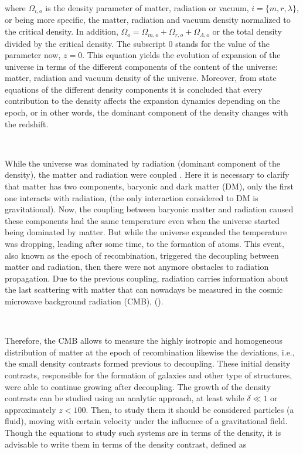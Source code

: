 \documentclass[a4,useAMS,usegraphicx,12pt]{article}
\begin{document}
where $\Omega_{i,o}$ is the density parameter of matter, radiation or vacuum, $i=\{m, r,\lambda\}$, 
or being more specific, the matter, radiation and vacuum density normalized to the critical density.  In addition, 
$\Omega_o=\Omega_{m,o} +\Omega_{r,o}+\Omega_{\Lambda,o}$ or the total density divided
by the critical density. The subscript $0$ stands for the value of the parameter now, $z=0$.
This equation yields the evolution of expansion of the universe in terms  
of the different components of the content of the universe: 
matter, radiation and vacuum density of the universe. 
Moreover, from state equations of the different density components it is concluded that every contribution to the density affects the expansion
dynamics depending on the epoch, or in other words,  the dominant component of the density 
changes with the redshift.  

\

While the universe was dominated 
by radiation (dominant component of the density), the matter and radiation were coupled . 
Here it is necessary to clarify that matter has two components, baryonic and dark matter (DM),
only the first one interacts with radiation, (the only interaction considered to DM is 
gravitational). 
Now, the coupling between baryonic matter
and radiation caused these components had the same temperature even when the universe 
started being dominated by matter. 
But while the universe expanded 
the temperature was dropping, leading after some time, to the formation of atoms. 
This event, also known as the epoch of recombination, triggered the decoupling between matter and radiation, 
then there were not anymore obstacles to radiation propagation. Due to the previous coupling, radiation carries 
information about the last scattering with matter that can nowadays be measured in the cosmic microwave 
background radiation (CMB), (\cite{SIZE}). 

\

Therefore, the CMB allows to measure the highly isotropic and homogeneous distribution of matter at the epoch
of recombination likewise the deviations, i.e., the small density contrasts formed previous to decoupling. 
These initial density contrasts, responsible for the formation of galaxies and other type of structures, were able to 
continue growing after decoupling. The growth of the density contrasts can be studied using an analytic approach,
at least while $\delta \ll 1$ or approximately $z<100$. 
Then, to study them it should be considered particles (a fluid), moving with certain velocity under the influence 
of a gravitational field. Though the equations to study such systems are in terms of 
the density, it is advisable to write them in terms of the density contrast, defined as 
\end{document}
